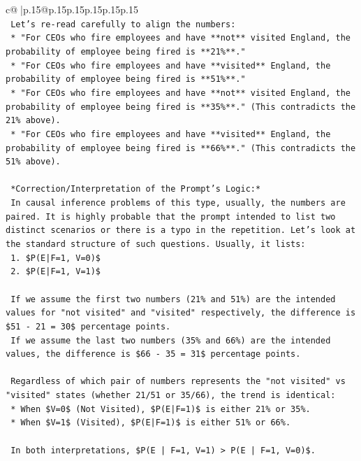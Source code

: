 \documentclass{article}
\begin{document}
{\begin{supertabular}{c@{$\;$}|p{.15\linewidth}@{}p{.15\linewidth}p{.15\linewidth}p{.15\linewidth}p{.15\linewidth}p{.15\linewidth}}
{{{\\ 
\texttt{    Let's re{-}read carefully to align the numbers:} \\
\texttt{    *   "For CEOs who fire employees and have **not** visited England, the probability of employee being fired is **21\%**."} \\
\texttt{    *   "For CEOs who fire employees and have **visited** England, the probability of employee being fired is **51\%**."} \\
\texttt{    *   "For CEOs who fire employees and have **not** visited England, the probability of employee being fired is **35\%**." (This contradicts the 21\% above).} \\
\texttt{    *   "For CEOs who fire employees and have **visited** England, the probability of employee being fired is **66\%**." (This contradicts the 51\% above).} \\
\\ 
\texttt{    *Correction/Interpretation of the Prompt's Logic:*} \\
\texttt{    In causal inference problems of this type, usually, the numbers are paired. It is highly probable that the prompt intended to list two distinct scenarios or there is a typo in the repetition. Let's look at the standard structure of such questions. Usually, it lists:} \\
\texttt{    1. \$P(E|F=1, V=0)\$} \\
\texttt{    2. \$P(E|F=1, V=1)\$} \\
\\ 
\texttt{    If we assume the first two numbers (21\% and 51\%) are the intended values for "not visited" and "visited" respectively, the difference is \$51 {-} 21 = 30\$ percentage points.} \\
\texttt{    If we assume the last two numbers (35\% and 66\%) are the intended values, the difference is \$66 {-} 35 = 31\$ percentage points.} \\
\\ 
\texttt{    Regardless of which pair of numbers represents the "not visited" vs "visited" states (whether 21/51 or 35/66), the trend is identical:} \\
\texttt{    *   When \$V=0\$ (Not Visited), \$P(E|F=1)\$ is either 21\% or 35\%.} \\
\texttt{    *   When \$V=1\$ (Visited), \$P(E|F=1)\$ is either 51\% or 66\%.} \\
\\ 
\texttt{    In both interpretations, \$P(E | F=1, V=1) > P(E | F=1, V=0)\$.} \\
}}}
\end{supertabular}}
\end{document}
